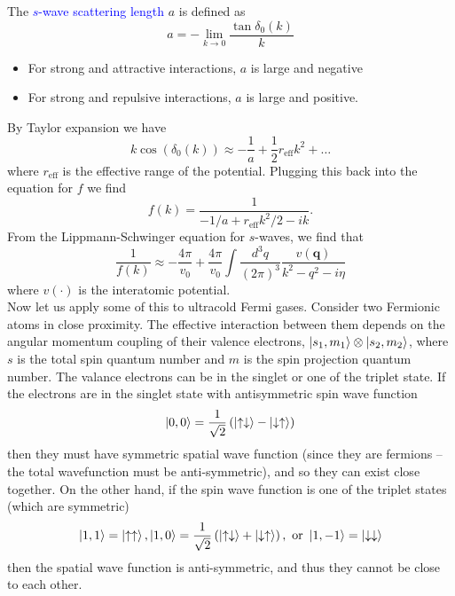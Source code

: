\documentclass{book}
\theoremstyle{definition}
\newcommand{\f}[2]{\frac{#1}{#2}}
\newcommand{\lp}{\left(}
\newcommand{\rp}{\right)}
\begin{document}
The \textcolor{blue}{$s$-wave scattering length} $a$ is defined as 
\begin{equation*}
a = -\lim_{k\to 0}\f{\tan \delta_0 (k)}{k}
\end{equation*}
\begin{itemize}
	\item For strong and attractive interactions, $a$ is large and negative
	
	\item For strong and repulsive interactions, $a$ is large and positive. 
\end{itemize}
By Taylor expansion we have
\begin{equation*}
k\cos(\delta_0(k)) \approx -\f{1}{a} + \f{1}{2}r_\text{eff} k^2 + \dots
\end{equation*}
where $r_\text{eff}$ is the effective range of the potential. Plugging this back into the equation for $f$ we find 
\begin{equation*}
f(k) = \f{1}{-1/a + r_\text{eff} k^2/2 - ik}.
\end{equation*}
From the Lippmann-Schwinger equation for $s$-waves, we find that 
\begin{equation*}
\f{1}{f(k)} \approx -\f{4\pi}{v_0} + \f{4\pi}{v_0} \int\f{d^3q}{(2\pi)^3} \f{v(\mathbf{q})}{k^2 - q^2 - i\eta}
\end{equation*}
where $v(\cdot)$ is the interatomic potential. \\


Now let us apply some of this to ultracold Fermi gases. Consider two Fermionic atoms in close proximity. The effective interaction between them depends on the angular momentum coupling of their valence electrons, $\ket{s_1,m_1}\otimes \ket{s_2,m_2}$, where $s$ is the total spin quantum number and $m$ is the spin projection quantum number. The valance electrons can be in the singlet or one of the triplet state. If the electrons are in the singlet state with antisymmetric spin wave function 
\begin{equation*}
\ket{0,0} = \f{1}{\sqrt{2}}\lp \ket{\uparrow\downarrow} - \ket{\downarrow \uparrow} \rp
\end{equation*}
then they must have symmetric spatial wave function (since they are fermions -- the total wavefunction must be anti-symmetric), and so they can exist close together. On the other hand, if the spin wave function is one of the triplet states (which are symmetric) 
\begin{equation*}
\ket{1,1} = \ket{\uparrow\uparrow}, \ket{1,0} = \f{1}{\sqrt{2}} \lp \ket{\uparrow\downarrow} + \ket{\downarrow\uparrow} \rp, \text{ or } \ket{1,-1} = \ket{\downarrow\downarrow}
\end{equation*}
then the spatial wave function is anti-symmetric, and thus they cannot be close to each other. \\
\end{document}

